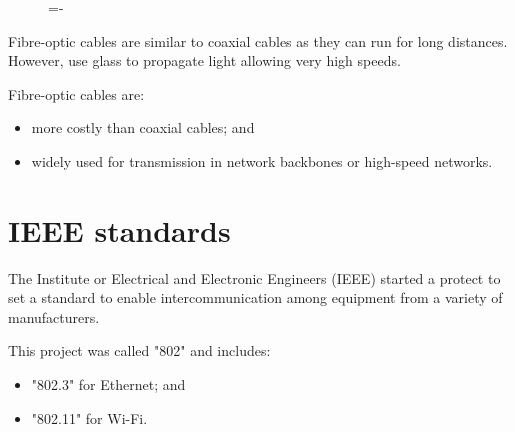 \documentclass[a4paper]{systems-software}
\begin{document}
\begin{figure}[H]
	\lineskip=-\fboxrule
\end{figure}

Fibre-optic cables are similar to coaxial cables as they can run for long distances. However, use glass to propagate light allowing very high speeds.

Fibre-optic cables are:
\begin{itemize}
	\item more costly than coaxial cables; and
	\item widely used for transmission in network backbones or high-speed networks.
\end{itemize}


\section*{IEEE standards}

The Institute or Electrical and Electronic Engineers (IEEE) started a protect to set a standard to enable intercommunication among equipment from a variety of manufacturers.

This project was called "802" and includes:
\begin{itemize}
	\item "802.3" for Ethernet; and
	\item "802.11" for Wi-Fi.
\end{itemize}
\end{document}
